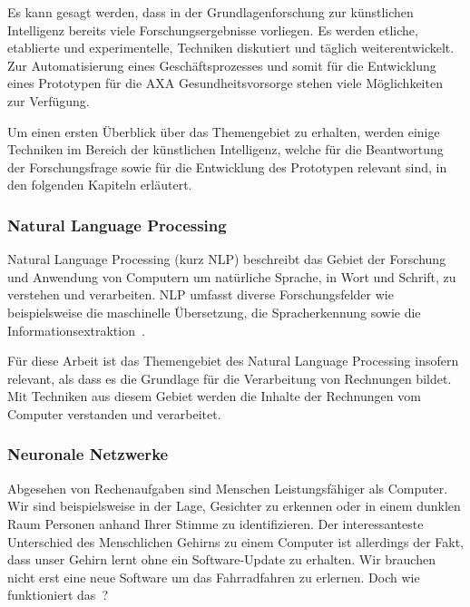 
Es kann gesagt werden, dass in der Grundlagenforschung zur künstlichen Intelligenz bereits viele Forschungsergebnisse vorliegen. Es werden etliche, etablierte und experimentelle, Techniken diskutiert und täglich weiterentwickelt. Zur Automatisierung eines Geschäftsprozesses und somit für die Entwicklung eines Prototypen für die AXA Gesundheitsvorsorge stehen viele Möglichkeiten zur Verfügung.

Um einen ersten Überblick über das Themengebiet zu erhalten, werden einige Techniken im Bereich der künstlichen Intelligenz, welche für die Beantwortung der Forschungsfrage sowie für die Entwicklung des Prototypen relevant sind, in den folgenden Kapiteln erläutert.

\subsubsection{Natural Language Processing}

Natural Language Processing (kurz NLP) beschreibt das Gebiet der Forschung und Anwendung von Computern um natürliche Sprache, in Wort und Schrift, zu verstehen und verarbeiten. NLP umfasst diverse Forschungsfelder wie beispielsweise die maschinelle Übersetzung, die Spracherkennung sowie die Informationsextraktion~\autocite{Chowdhury2003}. 

Für diese Arbeit ist das Themengebiet des Natural Language Processing insofern relevant, als dass es die Grundlage für die Verarbeitung von Rechnungen bildet. Mit Techniken aus diesem Gebiet werden die Inhalte der Rechnungen vom Computer verstanden und verarbeitet.

\subsubsection{Neuronale Netzwerke}

Abgesehen von Rechenaufgaben sind Menschen Leistungsfähiger als Computer. Wir sind beispielsweise in der Lage, Gesichter zu erkennen oder in einem dunklen Raum Personen anhand Ihrer Stimme zu identifizieren. Der interessanteste Unterschied des Menschlichen Gehirns zu einem Computer ist allerdings der Fakt, dass unser Gehirn lernt ohne ein Software-Update zu erhalten. Wir brauchen nicht erst eine neue Software um das Fahrradfahren zu erlernen. Doch wie funktioniert das~\autocite{Krogh2008}?

